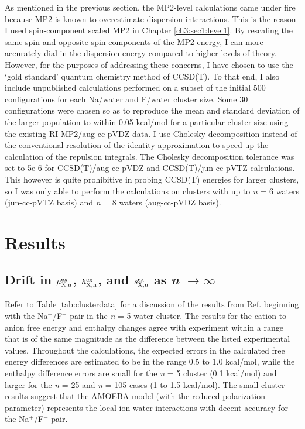 \begin{cpa}
  As mentioned in the previous section, the MP2-level calculations came under fire because MP2 is known to overestimate dispersion interactions\cite{tkatchenko2009dispersion}.
  This is the reason I used spin-component scaled MP2\cite{grimme2003scsmp2} in Chapter \ref{ch3:sec1:level1}. By rescaling the same-spin and opposite-spin components
  of the MP2 energy, I can more accurately dial in the dispersion energy compared to higher levels of theory. However, for the purposes of addressing these concerns,
  I have chosen to use the `gold standard' quantum chemistry method of CCSD(T). To that end, I also include unpublished calculations performed on a subset of the initial 
  500 configurations for each Na/water and F/water cluster size. Some 30 configurations were chosen so as to reproduce the mean and standard deviation of the larger population
  to within 0.05 kcal/mol for a particular cluster size using the existing RI-MP2/aug-cc-pVDZ data. I use Cholesky decomposition instead of the conventional resolution-of-the-identity
  approximation to speed up the calculation of the repulsion integrals. The Cholesky decomposition tolerance was set to 5e-6 for CCSD(T)/aug-cc-pVDZ and CCSD(T)/jun-cc-pVTZ calculations. 
  This however is quite prohibitive in probing CCSD(T) energies for larger clusters, so I was only able to perform the calculations on clusters with up to \emph{n} = 6 waters 
  (jun-cc-pVTZ basis) and \emph{n} = 8 waters (aug-cc-pVDZ basis).
  
  \section{\label{ch5:sec3:level1}Results}

  \subsection{\label{ch5:sec3:level2}Drift in $\mu^{\mathrm{ex}}_{\mathrm{X,n}}$, $h^{\mathrm{ex}}_{\mathrm{X,n}}$, and $s^{\mathrm{ex}}_{\mathrm{X,n}}$ as \emph{n} $\rightarrow \infty$}

  Refer to Table \ref{tab:clusterdata} for a discussion of the results from Ref. \cite{pollard2014cpa1} beginning with the Na$^+$/F$^-$ pair in the \emph{n} = 5 water cluster. 
  The results for the cation to anion free energy and enthalpy changes agree with experiment within a range that is of the same magnitude as the difference between the listed 
  experimental values. Throughout the calculations, the expected errors in the calculated free energy differences are estimated to be in the range 0.5 to 1.0 kcal/mol, while 
  the enthalpy difference errors are small for the \emph{n} = 5 cluster (0.1 kcal/mol) and larger for the \emph{n} = 25 and \emph{n} = 105 cases (1 to 1.5 kcal/mol). The 
  small-cluster results suggest that the AMOEBA model (with the reduced polarization parameter) represents the local ion-water interactions with decent accuracy for the 
  Na$^+$/F$^-$ pair.


\end{cpa}
